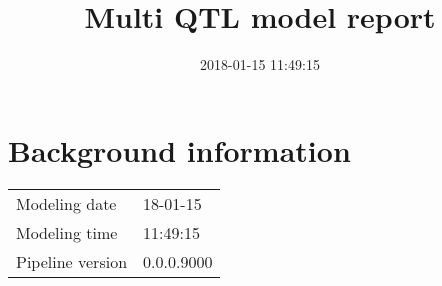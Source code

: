 \documentclass[a4paper,11pt]{article}\usepackage[]{graphicx}\usepackage[]{color}
\title{Multi QTL model report}%
\author{\vspace{-5ex}}
\date{2018-01-15 11:49:15}
\begin{document}


\maketitle
\singlespacing

\section{Background information}
\begin{table}[ht]
\begin{flushleft}
\begin{tabular}{ll}
  Modeling date & 18-01-15 \\ 
  Modeling time & 11:49:15 \\ 
  Pipeline version & 0.0.0.9000 \\ 
  \end{tabular}
\label{background}
\end{flushleft}
\end{table}


\end{document}
